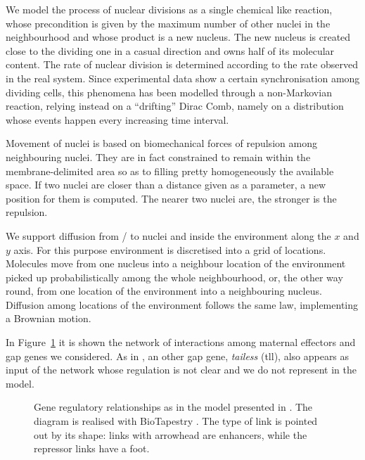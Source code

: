 \documentclass[12pt,a4paper,twoside,openright]{book}
\begin{document}
We model the process of nuclear divisions as a single chemical like reaction, whose precondition is given by the maximum number of other nuclei in the neighbourhood and whose product is a new nucleus. 
%
The new nucleus is created close to the dividing one in a casual direction and owns half of its molecular content.
%
The rate of nuclear division is determined according to the rate observed in the real system.
%
Since experimental data show a certain synchronisation among dividing cells, this phenomena has been modelled through a non-Markovian reaction, relying instead on a ``drifting'' Dirac Comb, namely on a distribution whose events happen every increasing time interval.

Movement of nuclei is based on biomechanical forces of repulsion among neighbouring nuclei. They are in fact constrained to remain within the membrane-delimited area so as to filling pretty homogeneously the available space.
%
If two nuclei are closer than a distance given as a parameter, a new position for them is computed. The nearer two nuclei are, the stronger is the repulsion.

We support diffusion from / to nuclei and inside the environment along the $x$ and $y$ axis.
%
For this purpose environment is discretised into a grid of locations.
%
Molecules move from one nucleus into a neighbour location of the environment picked up probabilistically among the whole neighbourhood, or, the other way round, from one location of the environment into a neighbouring nucleus.
%
Diffusion among locations of the environment follows the same law, implementing a Brownian motion.

In Figure~\ref{fig:genenetwork} it is shown the network of interactions among maternal effectors and gap genes we considered. As in \cite{perkins-compbio06}, an other gap gene, \emph{tailess} (tll), also  appears as input of the network whose regulation is not clear and we do not represent in the model. 

\begin{figure}
\caption{Gene regulatory relationships as in the model presented in \cite{perkins-compbio06,RiveraPomar,gursky04}. The diagram is realised with BioTapestry \cite{biotapestry-2009}. The type of link is pointed out by its shape: links with arrowhead are enhancers, while the repressor links have a foot.}
\label{fig:genenetwork}
\end{figure}
\end{document}
